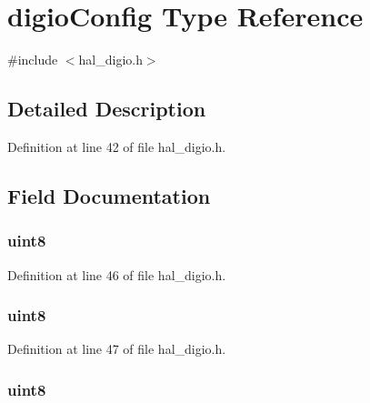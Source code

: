 \hypertarget{typedigio_config}{
\section{digioConfig Type Reference}
\label{typedigio_config}
}


{\ttfamily \#include $<$hal\_\-digio.h$>$}

\par
\par


\subsection{Detailed Description}


Definition at line 42 of file hal\_\-digio.h.



\subsection{Field Documentation}
\hypertarget{typedigio_config_aa70f99e9128c4ddd0b68dd69062853ef}{
\subsubsection[{dir}]{ {\bfseries uint8 } }}
\label{typedigio_config_aa70f99e9128c4ddd0b68dd69062853ef}


Definition at line 46 of file hal\_\-digio.h.

\hypertarget{typedigio_config_a32ab4979576a339e7510cedeaa80be8a}{
\subsubsection[{initval}]{ {\bfseries uint8 } }}
\label{typedigio_config_a32ab4979576a339e7510cedeaa80be8a}


Definition at line 47 of file hal\_\-digio.h.

\hypertarget{typedigio_config_a2a34f82d9842885e65a1ed26de00f6e1}{
\subsubsection[{pin}]{ {\bfseries uint8 } }}
\label{typedigio_config_a2a34f82d9842885e65a1ed26de00f6e1}


